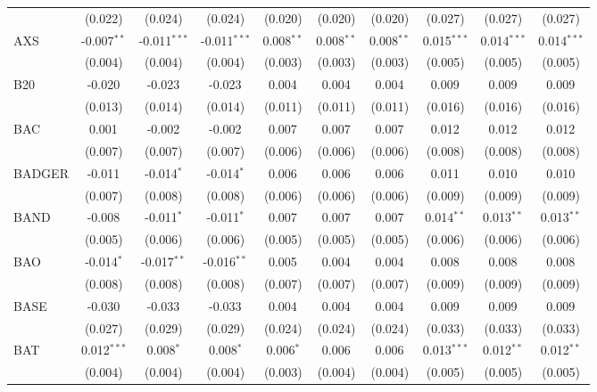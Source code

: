 \begin{table}[!htbp]
\begin{tabular}{@{\extracolsep{5pt}}lccccccccc}
  & (0.022) & (0.024) & (0.024) & (0.020) & (0.020) & (0.020) & (0.027) & (0.027) & (0.027) \\
 AXS & -0.007$^{**}$ & -0.011$^{***}$ & -0.011$^{***}$ & 0.008$^{**}$ & 0.008$^{**}$ & 0.008$^{**}$ & 0.015$^{***}$ & 0.014$^{***}$ & 0.014$^{***}$ \\
  & (0.004) & (0.004) & (0.004) & (0.003) & (0.003) & (0.003) & (0.005) & (0.005) & (0.005) \\
 B20 & -0.020$^{}$ & -0.023$^{}$ & -0.023$^{}$ & 0.004$^{}$ & 0.004$^{}$ & 0.004$^{}$ & 0.009$^{}$ & 0.009$^{}$ & 0.009$^{}$ \\
  & (0.013) & (0.014) & (0.014) & (0.011) & (0.011) & (0.011) & (0.016) & (0.016) & (0.016) \\
 BAC & 0.001$^{}$ & -0.002$^{}$ & -0.002$^{}$ & 0.007$^{}$ & 0.007$^{}$ & 0.007$^{}$ & 0.012$^{}$ & 0.012$^{}$ & 0.012$^{}$ \\
  & (0.007) & (0.007) & (0.007) & (0.006) & (0.006) & (0.006) & (0.008) & (0.008) & (0.008) \\
 BADGER & -0.011$^{}$ & -0.014$^{*}$ & -0.014$^{*}$ & 0.006$^{}$ & 0.006$^{}$ & 0.006$^{}$ & 0.011$^{}$ & 0.010$^{}$ & 0.010$^{}$ \\
  & (0.007) & (0.008) & (0.008) & (0.006) & (0.006) & (0.006) & (0.009) & (0.009) & (0.009) \\
 BAND & -0.008$^{}$ & -0.011$^{*}$ & -0.011$^{*}$ & 0.007$^{}$ & 0.007$^{}$ & 0.007$^{}$ & 0.014$^{**}$ & 0.013$^{**}$ & 0.013$^{**}$ \\
  & (0.005) & (0.006) & (0.006) & (0.005) & (0.005) & (0.005) & (0.006) & (0.006) & (0.006) \\
 BAO & -0.014$^{*}$ & -0.017$^{**}$ & -0.016$^{**}$ & 0.005$^{}$ & 0.004$^{}$ & 0.004$^{}$ & 0.008$^{}$ & 0.008$^{}$ & 0.008$^{}$ \\
  & (0.008) & (0.008) & (0.008) & (0.007) & (0.007) & (0.007) & (0.009) & (0.009) & (0.009) \\
 BASE & -0.030$^{}$ & -0.033$^{}$ & -0.033$^{}$ & 0.004$^{}$ & 0.004$^{}$ & 0.004$^{}$ & 0.009$^{}$ & 0.009$^{}$ & 0.009$^{}$ \\
  & (0.027) & (0.029) & (0.029) & (0.024) & (0.024) & (0.024) & (0.033) & (0.033) & (0.033) \\
 BAT & 0.012$^{***}$ & 0.008$^{*}$ & 0.008$^{*}$ & 0.006$^{*}$ & 0.006$^{}$ & 0.006$^{}$ & 0.013$^{***}$ & 0.012$^{**}$ & 0.012$^{**}$ \\
  & (0.004) & (0.004) & (0.004) & (0.003) & (0.004) & (0.004) & (0.005) & (0.005) & (0.005) \\

\end{tabular}
\end{table}
